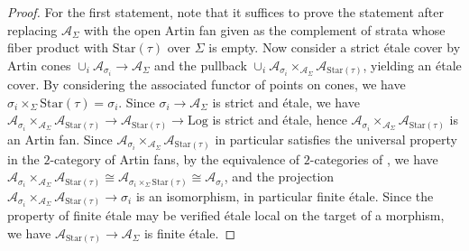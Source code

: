 \documentclass[12pt, oneside]{amsart}   	%
\numberwithin{equation}{section}
\numberwithin{thm}{section}
\numberwithin{figure}{section}
\begin{document}
\begin{proof}
For the first statement, note that it suffices to prove the statement after replacing $\mathcal{A}_{\Sigma}$ with the open Artin fan given as the complement of strata whose fiber product with $\text{Star}(\tau)$ over $\Sigma$ is empty. Now consider a strict \'etale cover by Artin cones $\cup_i \mathcal{A}_{\sigma_i} \rightarrow \mathcal{A}_\Sigma$ and the pullback $\cup_i \mathcal{A}_{\sigma_i}\times_{\mathcal{A}_\Sigma} \mathcal{A}_{\text{Star}(\tau)}$, yielding an \'etale cover. By considering the associated functor of points on cones, we have $\sigma_i \times_{\Sigma} \text{Star}(\tau) = \sigma_i$. Since $\sigma_i \rightarrow \mathcal{A}_{\Sigma}$ is strict and \'etale, we have $\mathcal{A}_{\sigma_i} \times_{\mathcal{A}_{\Sigma}} \mathcal{A}_{\text{Star}(\tau)} \rightarrow \mathcal{A}_{\text{Star}(\tau)} \rightarrow \text{Log}$ is strict and \'etale, hence $\mathcal{A}_{\sigma_i} \times_{\mathcal{A}_{\Sigma}} \mathcal{A}_{\text{Star}(\tau)}$ is an Artin fan. Since $\mathcal{A}_{\sigma_i} \times_{\mathcal{A}_{\Sigma}} \mathcal{A}_{\text{Star}(\tau)}$ in particular satisfies the universal property in the $2$-category of Artin fans, by the equivalence of $2$-categories of \cite[Theorem $6.11$]{stacktrop}, we have $\mathcal{A}_{\sigma_i} \times_{\mathcal{A}_{\Sigma}} \mathcal{A}_{\text{Star}(\tau)} \cong \mathcal{A}_{\sigma_i \times_{\Sigma} \text{Star}(\tau)} \cong \mathcal{A}_{\sigma_i}$, and the projection $\mathcal{A}_{\sigma_i} \times_{\mathcal{A}_{\Sigma}} \mathcal{A}_{\text{Star}(\tau)}  \rightarrow \sigma_i$ is an isomorphism, in particular finite \'etale. Since the property of finite \'etale may be verified \'etale local on the target of a morphism, we have $\mathcal{A}_{\text{Star}(\tau)} \rightarrow \mathcal{A}_{\Sigma}$ is finite \'etale. 


 
 






\end{proof}
\end{document}
